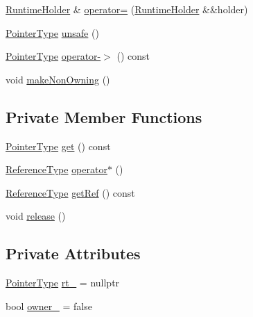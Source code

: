 \begin{DoxyCompactItemize}
\hyperlink{structvt_1_1runtime_1_1_runtime_holder}{Runtime\+Holder} \& \hyperlink{structvt_1_1runtime_1_1_runtime_holder_a77b0ac53097a24b419cdd33193627b11}{operator=} (\hyperlink{structvt_1_1runtime_1_1_runtime_holder}{Runtime\+Holder} \&\&holder)
\item 
\hyperlink{structvt_1_1runtime_1_1_runtime_holder_a9740e8aa7487fcf38b67a7e160d7b046}{Pointer\+Type} \hyperlink{structvt_1_1runtime_1_1_runtime_holder_aacba0762fe099fb04faa1fb308c7782b}{unsafe} ()
\item 
\hyperlink{structvt_1_1runtime_1_1_runtime_holder_a9740e8aa7487fcf38b67a7e160d7b046}{Pointer\+Type} \hyperlink{structvt_1_1runtime_1_1_runtime_holder_a63745eba0493db2bc670e633733ae908}{operator-\/$>$} () const
\item 
void \hyperlink{structvt_1_1runtime_1_1_runtime_holder_a3695fd20ff4f9058f34cb45e2b61232f}{make\+Non\+Owning} ()
\end{DoxyCompactItemize}
\subsection*{Private Member Functions}
\begin{DoxyCompactItemize}
\item 
\hyperlink{structvt_1_1runtime_1_1_runtime_holder_a9740e8aa7487fcf38b67a7e160d7b046}{Pointer\+Type} \hyperlink{structvt_1_1runtime_1_1_runtime_holder_a5b83161fd0866c5f9333856d06f589b4}{get} () const
\item 
\hyperlink{structvt_1_1runtime_1_1_runtime_holder_a45aaa245b06497cfce58452b0d64b3fa}{Reference\+Type} \hyperlink{structvt_1_1runtime_1_1_runtime_holder_a81e625195b2cb4e8de12928a354a2114}{operator$\ast$} ()
\item 
\hyperlink{structvt_1_1runtime_1_1_runtime_holder_a45aaa245b06497cfce58452b0d64b3fa}{Reference\+Type} \hyperlink{structvt_1_1runtime_1_1_runtime_holder_a998a38cda3304389bed85af42ac0a8c2}{get\+Ref} () const
\item 
void \hyperlink{structvt_1_1runtime_1_1_runtime_holder_a6a56c670252718c1533acafe6aa6a2c5}{release} ()
\end{DoxyCompactItemize}
\subsection*{Private Attributes}
\begin{DoxyCompactItemize}
\item 
\hyperlink{structvt_1_1runtime_1_1_runtime_holder_a9740e8aa7487fcf38b67a7e160d7b046}{Pointer\+Type} \hyperlink{structvt_1_1runtime_1_1_runtime_holder_a6b0f4efb09cd9dd6747aa5e8237e23ff}{rt\+\_\+} = nullptr
\item 
bool \hyperlink{structvt_1_1runtime_1_1_runtime_holder_ae6ae8cff59755abf98bcbd6709e9652f}{owner\+\_\+} = false
\end{DoxyCompactItemize}


